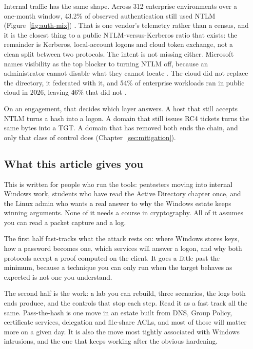 

Internal traffic has the same shape. Across 312 enterprise environments over a one-month window,
43.2\% of observed authentication still used NTLM (Figure~\ref{fig:auth-mix})
\cite{zeronetworks-2026}. That is one vendor's telemetry rather than a census, and it is the
closest thing to a public NTLM-versus-Kerberos ratio that exists: the remainder is Kerberos,
local-account logons and cloud token exchange, not a clean split between two protocols. The
intent is not missing either. Microsoft names visibility as the top blocker to turning NTLM off,
because an administrator cannot disable what they cannot locate \cite{ms-ntlmless-faq}. The cloud
did not replace the directory, it federated with it, and 54\% of enterprise workloads ran in
public cloud in 2026, leaving 46\% that did not \cite{flexera-2026}.



On an engagement, that decides which layer answers. A host that still accepts NTLM turns a hash
into a logon. A domain that still issues RC4 tickets turns the same bytes into a TGT. A domain
that has removed both ends the chain, and only that class of control does
(Chapter~\ref{sec:mitigation}).

\subsection{What this article gives you}
\label{sec:what-you-get}

This is written for people who run the tools: pentesters moving into internal Windows work,
students who have read the Active Directory chapter once, and the Linux admin who wants a real
answer to why the Windows estate keeps winning arguments. None of it needs a course in
cryptography. All of it assumes you can read a packet capture and a log.

The first half fast-tracks what the attack rests on: where Windows stores keys, how a password
becomes one, which services will answer a logon, and why both protocols accept a proof computed on
the client. It goes a little past the minimum, because a technique you can only run when the
target behaves as expected is not one you understand.

The second half is the work: a lab you can rebuild, three scenarios, the logs both ends produce,
and the controls that stop each step. Read it as a fast track all the same. Pass-the-hash is one
move in an estate built from DNS, Group Policy, certificate services, delegation and file-share
ACLs, and most of those will matter more on a given day. It is also the move most tightly
associated with Windows intrusions, and the one that keeps working after the obvious hardening.

